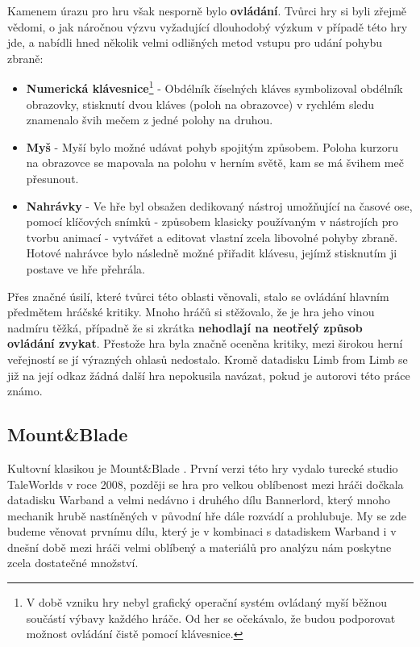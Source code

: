 Kamenem úrazu pro hru však nesporně bylo \textbf{ovládání}. Tvůrci hry si byli zřejmě vědomi, o jak náročnou výzvu vyžadující dlouhodobý výzkum v případě této hry jde, a nabídli hned několik velmi odlišných metod vstupu pro udání pohybu zbraně:
\begin{itemize}
    \item \textbf{Numerická klávesnice}\footnote{V době vzniku hry nebyl grafický operační systém ovládaný myší běžnou součástí výbavy každého hráče. Od her se očekávalo, že budou podporovat možnost ovládání čistě pomocí klávesnice.} - Obdélník číselných kláves symbolizoval obdélník obrazovky, stisknutí dvou kláves (poloh na obrazovce) v rychlém sledu znamenalo švih mečem z jedné polohy na druhou.
    \item \textbf{Myš} - Myší bylo možné udávat pohyb spojitým způsobem. Poloha kurzoru na obrazovce se mapovala na polohu v herním světě, kam se má švihem meč přesunout. 
    \item \textbf{Nahrávky} - Ve hře byl obsažen dedikovaný nástroj umožňující na časové ose, pomocí klíčových snímků - způsobem klasicky používaným v nástrojích pro tvorbu animací - vytvářet a editovat vlastní zcela libovolné pohyby zbraně. Hotové nahrávce bylo následně možné přiřadit klávesu, jejímž stisknutím ji postave ve hře přehrála. 
\end{itemize}   
Přes značné úsilí, které tvůrci této oblasti věnovali, stalo se ovládání hlavním předmětem hráčské kritiky. Mnoho hráčů si stěžovalo, že je hra jeho vinou nadmíru těžká, případně že si zkrátka \textbf{nehodlají na neotřelý způsob ovládání zvykat}. Přestože hra byla značně oceněna kritiky, mezi širokou herní veřejností se jí výrazných ohlasů nedostalo. Kromě datadisku Limb from Limb se již na její odkaz žádná další hra nepokusila navázat, pokud je autorovi této práce známo.





\subsection{Mount\&Blade}

Kultovní klasikou je Mount\&Blade \cite{MountAndBlade}. První verzi této hry vydalo turecké studio TaleWorlds v roce 2008, později se hra pro velkou oblíbenost mezi hráči dočkala datadisku Warband a velmi nedávno i druhého dílu Bannerlord, který mnoho mechanik hrubě nastíněných v původní hře dále rozvádí a prohlubuje. My se zde budeme věnovat prvnímu dílu, který je v kombinaci s datadiskem Warband i v dnešní době mezi hráči velmi oblíbený a materiálů pro analýzu nám poskytne zcela dostatečné množství.

